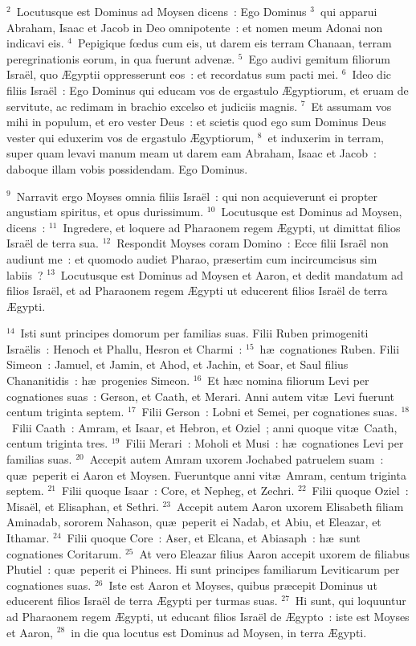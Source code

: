 ${}^{2}$~Locutusque est Dominus ad Moysen dicens~: Ego Dominus
${}^{3}$~qui apparui Abraham, Isaac et Jacob in Deo omnipotente~: et nomen meum Adonai non indicavi eis.
${}^{4}$~Pepigique fœdus cum eis, ut darem eis terram Chanaan, terram peregrinationis eorum, in qua fuerunt adven\ae .
${}^{5}$~Ego audivi gemitum filiorum Isra\"el, quo \AE gyptii oppresserunt eos~: et recordatus sum pacti mei.
${}^{6}$~Ideo dic filiis Isra\"el~: Ego Dominus qui educam vos de ergastulo \AE gyptiorum, et eruam de servitute, ac redimam in brachio excelso et judiciis magnis.
${}^{7}$~Et assumam vos mihi in populum, et ero vester Deus~: et scietis quod ego sum Dominus Deus vester qui eduxerim vos de ergastulo \AE gyptiorum,
${}^{8}$~et induxerim in terram, super quam levavi manum meam ut darem eam Abraham, Isaac et Jacob~: daboque illam vobis possidendam. Ego Dominus.


${}^{9}$~Narravit ergo Moyses omnia filiis Isra\"el~: qui non acquieverunt ei propter angustiam spiritus, et opus durissimum.
${}^{10}$~Locutusque est Dominus ad Moysen, dicens~:
${}^{11}$~Ingredere, et loquere ad Pharaonem regem \AE gypti, ut dimittat filios Isra\"el de terra sua.
${}^{12}$~Respondit Moyses coram Domino~: Ecce filii Isra\"el non audiunt me~: et quomodo audiet Pharao, pr\ae sertim cum incircumcisus sim labiis~?
${}^{13}$~Locutusque est Dominus ad Moysen et Aaron, et dedit mandatum ad filios Isra\"el, et ad Pharaonem regem \AE gypti ut educerent filios Isra\"el de terra \AE gypti.


${}^{14}$~Isti sunt principes domorum per familias suas. Filii Ruben primogeniti Isra\"elis~: Henoch et Phallu, Hesron et Charmi~:
${}^{15}$~h\ae\ cognationes Ruben. Filii Simeon~: Jamuel, et Jamin, et Ahod, et Jachin, et Soar, et Saul filius Chananitidis~: h\ae\ progenies Simeon.
${}^{16}$~Et h\ae c nomina filiorum Levi per cognationes suas~: Gerson, et Caath, et Merari. Anni autem vit\ae\ Levi fuerunt centum triginta septem.
${}^{17}$~Filii Gerson~: Lobni et Semei, per cognationes suas.
${}^{18}$~Filii Caath~: Amram, et Isaar, et Hebron, et Oziel~; anni quoque vit\ae\ Caath, centum triginta tres.
${}^{19}$~Filii Merari~: Moholi et Musi~: h\ae\ cognationes Levi per familias suas.
${}^{20}$~Accepit autem Amram uxorem Jochabed patruelem suam~: qu\ae\ peperit ei Aaron et Moysen. Fueruntque anni vit\ae\ Amram, centum triginta septem.
${}^{21}$~Filii quoque Isaar~: Core, et Nepheg, et Zechri.
${}^{22}$~Filii quoque Oziel~: Misa\"el, et Elisaphan, et Sethri.
${}^{23}$~Accepit autem Aaron uxorem Elisabeth filiam Aminadab, sororem Nahason, qu\ae\ peperit ei Nadab, et Abiu, et Eleazar, et Ithamar.
${}^{24}$~Filii quoque Core~: Aser, et Elcana, et Abiasaph~: h\ae\ sunt cognationes Coritarum.
${}^{25}$~At vero Eleazar filius Aaron accepit uxorem de filiabus Phutiel~: qu\ae\ peperit ei Phinees. Hi sunt principes familiarum Leviticarum per cognationes suas.
${}^{26}$~Iste est Aaron et Moyses, quibus pr\ae cepit Dominus ut educerent filios Isra\"el de terra \AE gypti per turmas suas.
${}^{27}$~Hi sunt, qui loquuntur ad Pharaonem regem \AE gypti, ut educant filios Isra\"el de \AE gypto~: iste est Moyses et Aaron,
${}^{28}$~in die qua locutus est Dominus ad Moysen, in terra \AE gypti.


